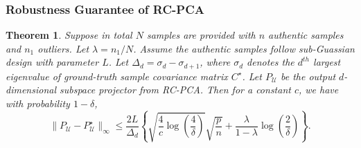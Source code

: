 \documentclass[11pt]{article}
\newtheorem{theorem}{Theorem}
\begin{document}
\subsubsection{Robustness Guarantee of RC-PCA}
\begin{theorem}
	\label{theo:rpca}
	Suppose in total $ N $ samples are provided with $n$  authentic samples and $n_1$ outliers. Let  $\lambda = n_1/N$.
	Assume the authentic samples follow sub-Guassian design with parameter $ L $.
Let $\Delta_d = \sigma_d - \sigma_{d+1}$, where $\sigma_d$ denotes the $d^{th}$ largest eigenvalue of ground-truth sample covariance matrix $C^\star$.
	Let $P_{\mathcal{U}}$ be the output $d$-dimensional subspace projector from RC-PCA. Then for a constant $c$,  we have with probability $1-\delta$,
	\begin{equation*}
	 \| P_{\mathcal{U}} - P_{\mathcal{U}}^\star\|_\infty \leq     \frac{2L}{\Delta_d} \left\{ \sqrt{\frac{4}{c} \log(\frac{4}{\delta})} \sqrt{\frac{p}{n}}  
	 +  \frac{\lambda}{1-\lambda } \log (\frac{2}{\delta}) \right\}.
	\end{equation*}
\end{theorem}
\end{document}
